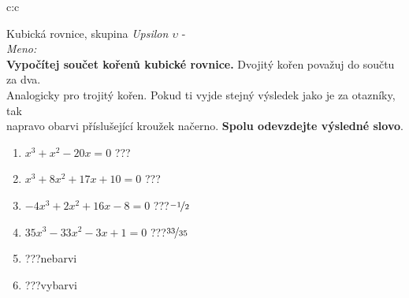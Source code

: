 \documentclass[10pt]{report}
\begin{document}
\clearpage
\thispagestyle{empty}
\begin{tabular}{c:c}
\begin{minipage}[c][99mm][t]{0.49\linewidth}
\begin{center}
\vspace{7mm}
{\huge Kubická rovnice, skupina \textit{Upsilon $\upsilon$} -}\\[4.5mm]
\textit{Meno:}\phantom{xxxxxxxxxxxxxxxxxxxxxxxxxxxxxxxxxxxxxxxxxxxxxxxxxxxxxxxxxxxxxxxxx}\\[3.5mm]
\textbf{Vypočítej součet kořenů kubické rovnice.} Dvojitý kořen považuj do součtu za dva.\\Analogicky pro trojitý kořen. Pokud ti vyjde stejný výsledek jako je za otazníky, tak\\napravo obarvi příslušející kroužek načerno. \textbf{Spolu odevzdejte výsledné slovo}.\\[3mm]
\begin{minipage}{0.77\linewidth}
\begin{center}
\begin{varwidth}{\textwidth}
\begin{enumerate}
\large
\item $x^3+x^2-20x=0$\quad \dotfill\; ???\;\dotfill {}
\item $x^3+8x^2+17x+10=0$\quad \dotfill\; ???\;\dotfill {}
\item $-4x^3+2x^2+16x-8=0$\quad \dotfill\; ???\;\dotfill \quad $\nicefrac{-1}{2}$
\item $35x^3-33x^2-3x+1=0$\quad \dotfill\; ???\;\dotfill \quad $\nicefrac{33}{35}$
\item \quad \dotfill\; ???\;\dotfill \quad nebarvi
\item \quad \dotfill\; ???\;\dotfill \quad vybarvi
\end{enumerate}
\end{varwidth}
\end{center}
\end{minipage}
\begin{minipage}{0.20\linewidth}

\end{minipage}
\end{center}
\end{minipage}
\end{tabular}
\end{document}
